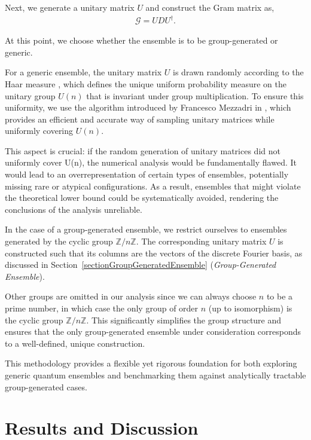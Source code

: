 \documentclass[12pt,letterpaper]{article}
\begin{document}
Next, we generate a unitary matrix $U$ and construct the Gram matrix as,
\begin{align*}
	\mathcal{G} = U D U^\dagger.
\end{align*}

At this point, we choose whether the ensemble is to be group-generated or generic.

For a generic ensemble, the unitary matrix $U$ is drawn randomly according to the Haar measure \cite{haarMeasure}, which defines the unique uniform probability measure on the unitary group $U(n)$ that is invariant under group multiplication. To ensure this uniformity, we use the algorithm introduced by Francesco Mezzadri in \cite{UnitaryMatricesGeneration}, which provides an efficient and accurate way of sampling unitary matrices while uniformly covering $U(n)$. 

This aspect is crucial: if the random generation of unitary matrices did not uniformly cover U(n), the numerical analysis would be fundamentally flawed. It would lead to an overrepresentation of certain types of ensembles, potentially missing rare or atypical configurations. As a result, ensembles that might violate the theoretical lower bound could be systematically avoided, rendering the conclusions of the analysis unreliable.

In the case of a group-generated ensemble, we restrict ourselves to ensembles generated by the cyclic group $\mathbb{Z}/n\mathbb{Z}$. The corresponding unitary matrix $U$ is constructed such that its columns are the vectors of the discrete Fourier basis, as discussed in Section~\ref{sectionGroupGeneratedEnsemble} (\emph{Group-Generated Ensemble}).

Other groups are omitted in our analysis since we can always choose $n$ to be a prime number, in which case the only group of order $n$ (up to isomorphism) is the cyclic group $\mathbb{Z}/n\mathbb{Z}$. This significantly simplifies the group structure and ensures that the only group-generated ensemble under consideration corresponds to a well-defined, unique construction.

This methodology provides a flexible yet rigorous foundation for both exploring generic quantum ensembles and benchmarking them against analytically tractable group-generated cases.

\newpage
\section{Results and Discussion}\label{sectionResultsAndDiscussion}
\end{document}
